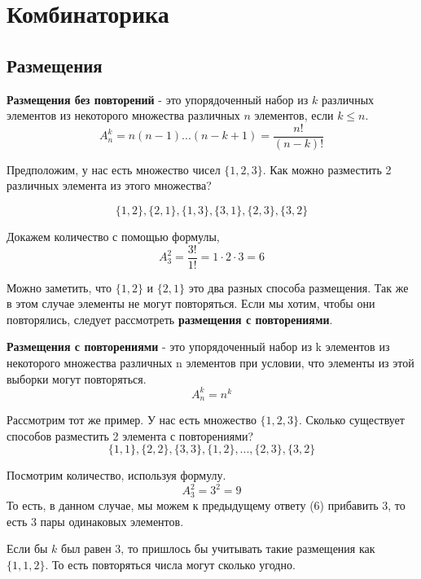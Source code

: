 \chapter{Комбинаторика}
\section{Размещения}

\begin{utv}
    \textbf{Размещения без повторений} - это упорядоченный набор из $k$ различных 
    элементов из некоторого множества различных $n$ элементов, если $k \leq n$.
    \begin{equation}
        A^k_n = n(n-1)...(n-k+1)=\frac{n!}{(n-k)!}
    \end{equation}
\end{utv}

Предположим, у нас есть множество чисел $\{1, 2, 3\}$. Как можно разместить 2 различных элемента из
этого множества?

\begin{equation*}
    \{1, 2\}, \{2, 1\}, \{1, 3\}, \{3, 1\}, \{2, 3\}, \{3, 2\}
\end{equation*}

Докажем количество с помощью формулы,
\begin{equation*}
    A^2_3 = \frac{3!}{1!} = 1 \cdot 2 \cdot 3 = 6
\end{equation*}

Можно заметить, что $\{1, 2\}$ и $\{2, 1\}$ это два разных способа размещения.
Так же в этом случае элементы не могут повторяться. Если мы хотим, чтобы они повторялись, следует рассмотреть
\textbf{размещения с повторениями}.

\begin{utv}
    \textbf{Размещения с повторениями} - это упорядоченный набор из k элементов из некоторого
    множества различных n элементов при условии, что элементы из этой выборки могут повторяться.
    \begin{equation}
        A^k_n = n^k
    \end{equation}
\end{utv}

Рассмотрим тот же пример. У нас есть множество $\{1, 2, 3\}$. Сколько существует способов разместить 2 элемента
с повторениями?
\begin{equation*}
    \{1, 1\}, \{2, 2\}, \{3, 3\}, \{1, 2\}, ..., \{2, 3\}, \{3, 2\}
\end{equation*}

Посмотрим количество, используя формулу.
\begin{equation*}
    A^2_3 = 3^2 = 9
\end{equation*}
То есть, в данном случае, мы можем к предыдущему ответу (6) прибавить 3, то есть 3 пары одинаковых элементов.
\begin{remark*}
    Если бы $k$ был равен 3, то пришлось бы учитывать такие размещения как $\{1, 1, 2\}$. То есть
    повторяться числа могут сколько угодно.
\end{remark*}

